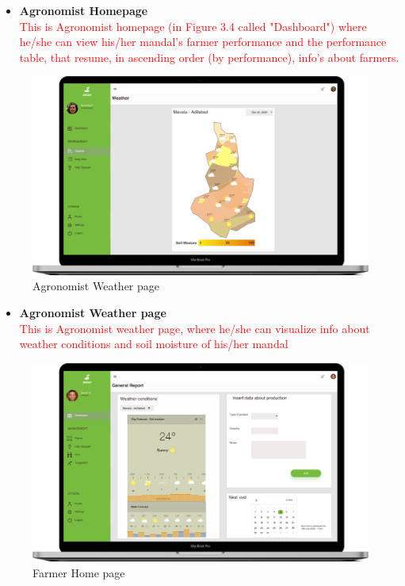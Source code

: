 \begin{itemize}
    \item \textbf{Agronomist Homepage}\\ 
    \textcolor{red}{This is Agronomist homepage (in Figure 3.4 called "Dashboard") where he/she can view his/her mandal's farmer performance and the performance table, that resume, in ascending order (by performance), info's about farmers.}
\end{itemize}


\begin{figure}[H]
  \includegraphics[width=140mm,scale=0.9]{./Images//Mocks/WebApp/Agronomist_Weather.png}
  \caption{Agronomist Weather page}
\end{figure}

\begin{itemize}
    \item \textbf{Agronomist Weather page}\\ 
    \textcolor{red}{This is Agronomist weather page, where he/she can visualize info about weather conditions and soil moisture of his/her mandal}
\end{itemize}


\begin{figure}[H]
  \includegraphics[width=140mm,scale=0.9]{./Images//Mocks/WebApp/Farmer_Home.png}
  \caption{Farmer Home page}
\end{figure}

